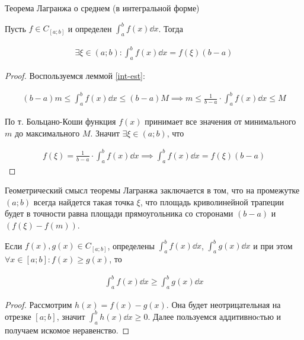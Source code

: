 \begin{theorem}\label{L-mid-int}
  Теорема Лагранжа о среднем (в интегральной форме)

  Пусть \(f \in C_{[a;b]}\) и определен \(\int_{a}^{b} f(x) \dd x\). Тогда

  \begin{align*}
    \exists \xi \in (a; b) \colon \int_{a}^{b} f(x) \dd x = f(\xi) (b - a)
  \end{align*}
\end{theorem}
\begin{proof}
  Воспользуемся леммой \ref{int-est}:

  \begin{align*}
    (b - a) m \le \int_{a}^{b} f(x) \dd x \le (b - a) M
    \implies m \le \frac{1}{b - a} \cdot \int_{a}^{b} f(x) \dd x \le M
  \end{align*}

  По т. Больцано-Коши функция \(f(x)\) принимает все значения от минимального
  \(m\) до максимального \(M\). Значит \(\exists \xi \in (a; b)\), что

  \begin{align*}
    f(\xi) = \frac{1}{b - a} \cdot \int_{a}^{b} f(x) \dd x
    \implies \int_{a}^{b} f(x) \dd x = f(\xi) (b - a)
  \end{align*}
\end{proof}

\begin{remark}
  Геометрический смысл теоремы Лагранжа заключается в том, что на промежутке
  \((a; b)\) всегда найдется такая точка \(\xi\), что площадь криволинейной
  трапеции будет в точности равна площади прямоугольника со сторонами
  \((b - a)\) и \((f(\xi) - f(m))\).
\end{remark}

\begin{lemma}
  Если \(f(x), g(x) \in C_{[a; b]}\), определены
  \(\int_{a}^{b} f(x) \dd x\), \(\int_{a}^{b} g(x) \dd x\)
  и при этом
  \(\forall x \in [a; b] \colon f(x) \ge g(x)\), то

  \begin{align*}
    \int_{a}^{b} f(x) \dd x \ge \int_{a}^{b} g(x) \dd x
  \end{align*}
\end{lemma}
\begin{proof}
  Рассмотрим \(h(x) = f(x) - g(x)\). Она будет неотрицательная на отрезке
  \([a; b]\), значит \(\int_{a}^{b} h(x) \dd x \ge 0\). Далее пользуемся
  аддитивноcтью и получаем искомое неравенство.
\end{proof}

